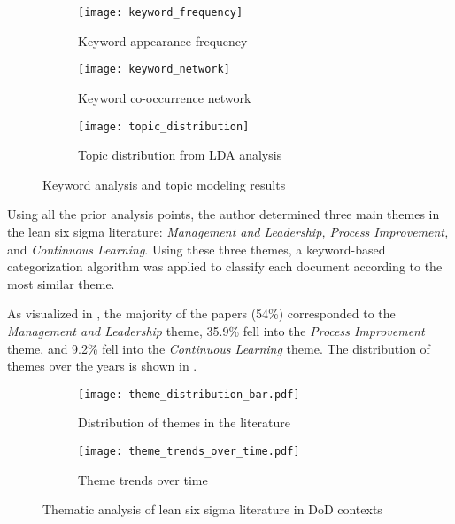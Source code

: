 \documentclass{article}
\begin{document}
	\begin{figure}[htbp]
		\centering
		\begin{subfigure}[b]{0.32\textwidth}
			\centering
			\texttt{[image: keyword\_frequency]}
			\caption{Keyword appearance frequency}
			\label{fig:keyword_freq}
		\end{subfigure}
		\hfill
		\begin{subfigure}[b]{0.32\textwidth}
			\centering
			\texttt{[image: keyword\_network]}
			\caption{Keyword co-occurrence network}
			\label{fig:keyword_network}
		\end{subfigure}
		\hfill
		\begin{subfigure}[b]{0.32\textwidth}
			\centering
			\texttt{[image: topic\_distribution]}
			\caption{Topic distribution from LDA analysis}
			\label{fig:topics}
		\end{subfigure}
		\caption{Keyword analysis and topic modeling results}
		\label{fig:keyword_analysis}
	\end{figure}

	Using all the prior analysis points, the author determined three main themes in the lean six sigma literature: \textit{Management and Leadership, Process Improvement,} and \textit{Continuous Learning}. 
	Using these three themes, a keyword-based categorization algorithm was applied to classify each document according to the most similar theme.

	As visualized in , the majority of the papers (54\%) corresponded to the \textit{Management and Leadership} theme, 35.9\% fell into the \textit{Process Improvement} theme, and 9.2\% fell into the \textit{Continuous Learning} theme.
	The distribution of themes over the years is shown in .

	\begin{figure}[htbp]
		\centering
		\begin{subfigure}[b]{0.48\textwidth}
			\centering
			\texttt{[image: theme\_distribution\_bar.pdf]}
			\caption{Distribution of themes in the literature}
			\label{fig:theme_distribution_bar}
		\end{subfigure}
		\hfill
		\begin{subfigure}[b]{0.48\textwidth}
			\centering
			\texttt{[image: theme\_trends\_over\_time.pdf]}
			\caption{Theme trends over time}
			\label{fig:theme_trends}
		\end{subfigure}
		\caption{Thematic analysis of lean six sigma literature in DoD contexts}
		\label{fig:theme_analysis}
	\end{figure}
\end{document}
